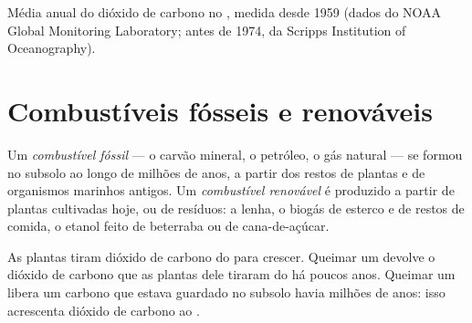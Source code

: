 \begin{omfigure}

{\small Média anual do dióxido de carbono no , medida desde 1959
(dados do NOAA Global Monitoring Laboratory; antes de 1974, da Scripps
Institution of Oceanography).}
\end{omfigure}

\section{Combustíveis fósseis e renováveis}

\begin{definition}\label{def:g8:combustion-and-fuels:fossil}
Um \emph{combustível fóssil} --- o carvão
mineral, o petróleo, o gás natural --- se formou no subsolo ao longo de
milhões de anos, a partir dos restos de plantas e de organismos
marinhos antigos. Um \emph{combustível renovável}
é produzido a partir de plantas cultivadas hoje, ou de
resíduos: a lenha, o biogás de esterco e de restos de comida, o etanol
feito de beterraba ou de cana-de-açúcar.
\end{definition}

\begin{proposition}\label{prop:g8:combustion-and-fuels:cycle}
As plantas tiram dióxido de carbono do  para crescer. Queimar um
 devolve o dióxido de carbono que as plantas dele
tiraram do  há poucos anos. Queimar um  libera um
carbono que estava guardado no subsolo havia milhões de anos: isso
acrescenta dióxido de carbono ao .
\end{proposition}

